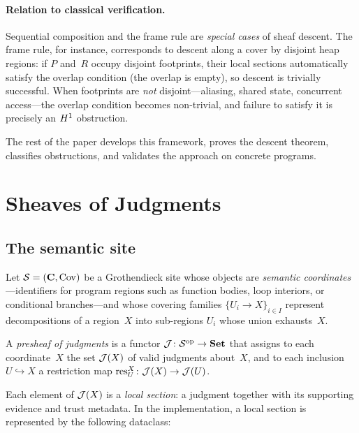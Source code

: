 \documentclass[11pt]{article}
\begin{document}
\paragraph{Relation to classical verification.}
Sequential composition and the frame rule are \emph{special cases} of sheaf
descent.  The frame rule, for instance, corresponds to descent along a cover
by disjoint heap regions: if $P$ and~$R$ occupy disjoint footprints, their
local sections automatically satisfy the overlap condition (the overlap is
empty), so descent is trivially successful.  When footprints are \emph{not}
disjoint---aliasing, shared state, concurrent access---the overlap condition
becomes non-trivial, and failure to satisfy it is precisely an $H^{1}$
obstruction.

The rest of the paper develops this framework, proves the descent theorem,
classifies obstructions, and validates the approach on concrete programs.


\section{Sheaves of Judgments}\label{sec:sheaves}

\subsection{The semantic site}

Let $\mathcal{S} = (\mathbf{C}, \mathrm{Cov})$ be a Grothendieck site whose objects are
\emph{semantic coordinates}---identifiers for program regions such as
function bodies, loop interiors, or conditional branches---and whose
covering families $\{U_i \to X\}_{i \in I}$ represent decompositions of a
region~$X$ into sub-regions $U_i$ whose union exhausts~$X$.

\begin{definition}\label{def:presheaf}
A \emph{presheaf of judgments} is a functor
$\mathcal{J} \colon \mathcal{S}^{\mathrm{op}} \to \mathbf{Set}$ that assigns to each
coordinate~$X$ the set $\mathcal{J}(X)$ of valid judgments about~$X$, and to each
inclusion $U \hookrightarrow X$ a restriction map
$\mathrm{res}^X_U \colon \mathcal{J}(X) \to \mathcal{J}(U)$.
\end{definition}

Each element of $\mathcal{J}(X)$ is a \emph{local section}: a judgment together with
its supporting evidence and trust metadata.  In the \JuGeo{} implementation,
a local section is represented by the following dataclass:
\end{document}
